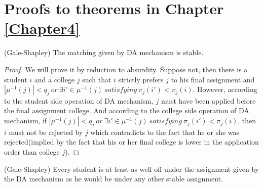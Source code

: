 
\chapter{Proofs to theorems in Chapter \ref{Chapter4}} %

\label{Appendix_D} %


\begin{thm*}(Gale-Shapley)
The matching given by DA mechanism is stable.
\end{thm*}

\begin{proof}
We will prove it by reduction to absurdity. Suppose not, then there is
a student $i$ and  a college $j$  such that $i$ strictly prefers $j$ to his
final assignment and $|\mu^{-1}(j)|< q_j\ or\  \exists i' \in
\mu^{-1}(j)\  satisfying\ \pi_{j}(i') < \pi_{j}(i)$.  However,
according to the student side operation of DA mechanism,  $j$ must have been applied before the
final assignment college. And  according to the college side operation
of DA mechanism, if  $|\mu^{-1}(j)|< q_j\ or\  \exists i' \in
\mu^{-1}(j)\  satisfying\ \pi_{j}(i') < \pi_{j}(i)$, then $i$ must not
be rejected by $j$ which contradicts to the fact that he or she was
rejected(implied by the fact that his or her final college is lower in
the application order than college $j$).
\end{proof}
\begin{thm*}(Gale-Shapley)
Every student is at least as well off under the assignment given by
the DA mechanism as he would be under any other stable assignment.
\end{thm*}

